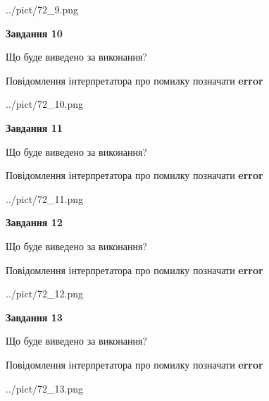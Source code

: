 \documentclass[11pt, ukrainian]{article}
\begin{document}
{\begin {large}
\begin{center}
	{../pict/72_9.png}
\end{center}
\newpage

{\begin {center}\textbf{Завдання 10}\end {center}}\par
Що буде виведено за виконання? \par
Повідомлення інтерпретатора про помилку позначати \textbf{error}

\begin{center}
	{../pict/72_10.png}
\end{center}
\newpage

{\begin {center}\textbf{Завдання 11}\end {center}}\par
Що буде виведено за виконання? \par
Повідомлення інтерпретатора про помилку позначати \textbf{error}

\begin{center}
	{../pict/72_11.png}
\end{center}
\newpage

{\begin {center}\textbf{Завдання 12}\end {center}}\par
Що буде виведено за виконання? \par
Повідомлення інтерпретатора про помилку позначати \textbf{error}

\begin{center}
	{../pict/72_12.png}
\end{center}
\newpage

{\begin {center}\textbf{Завдання 13}\end {center}}\par
Що буде виведено за виконання? \par
Повідомлення інтерпретатора про помилку позначати \textbf{error}

\begin{center}
	{../pict/72_13.png}
\end{center}
\newpage


\end{large}}
\end{document}
